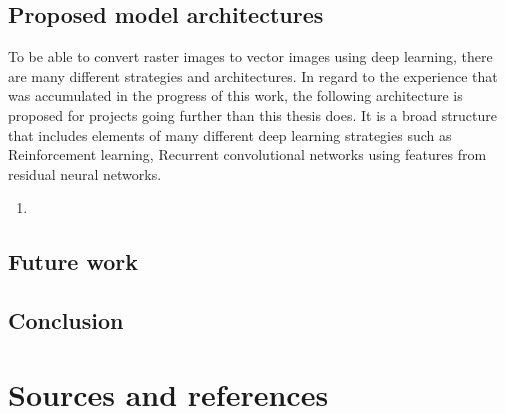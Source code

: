 \documentclass[12pt, a4paper, titlepage]{report}
\begin{document}
\section{Proposed model architectures}

To be able to convert raster images to vector images using deep learning, there are many different strategies and architectures. In regard to the experience that was accumulated in the progress of this work, the following architecture is proposed for projects going further than this thesis does. It is a broad structure that includes elements of many different deep learning strategies such as Reinforcement learning, Recurrent convolutional networks using features from residual neural networks.

\begin{enumerate}
   \item 
\end{enumerate}

\section{Future work}

\section{Conclusion}


\chapter{Sources and references}
\end{document}
